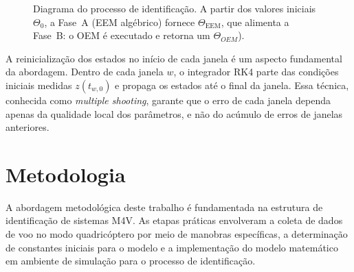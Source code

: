 \documentclass{ieeeaccess}
\begin{document}
\begin{figure}[!htbp]
{%
}
\caption{Diagrama do processo de identificação. A partir dos valores iniciais {$\Theta_0$}, a Fase~A (EEM algébrico) fornece {$\Theta_{\text{EEM}}$}, que alimenta a Fase~B: o OEM é executado e retorna um {$\Theta_{OEM}$}).}
\label{fig:oem_diagram}
\end{figure}

A reinicialização dos estados no início de cada janela é um aspecto fundamental da abordagem. Dentro de cada janela $w$, o integrador RK4 parte das condições iniciais medidas $z(t_{w,0})$ e propaga os estados até o final da janela. Essa técnica, conhecida como \textit{multiple shooting}, garante que o erro de cada janela dependa apenas da qualidade local dos parâmetros, e não do acúmulo de erros de janelas anteriores.

\section{Metodologia}
\label{sec:metodologia}

A abordagem metodológica deste trabalho é fundamentada na estrutura de identificação de sistemas M4V. As etapas práticas envolveram a coleta de dados de voo no modo quadricóptero por meio de manobras específicas, a determinação de constantes iniciais para o modelo e a implementação do modelo matemático em ambiente de simulação para o processo de identificação.
\end{document}
